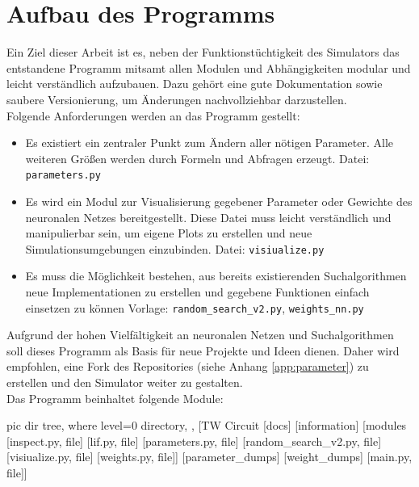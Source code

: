 \section{Aufbau des Programms}
\label{sec:imp_module}
	Ein Ziel dieser Arbeit ist es, neben der Funktionstüchtigkeit des Simulators das entstandene Programm mitsamt allen Modulen und Abhängigkeiten modular und leicht verständlich aufzubauen. Dazu gehört eine gute Dokumentation sowie saubere Versionierung, um Änderungen nachvollziehbar darzustellen.\\
	Folgende Anforderungen werden an das Programm gestellt:
	\begin{itemize}
		\item Es existiert ein zentraler Punkt zum Ändern aller nötigen Parameter. Alle weiteren Größen werden durch Formeln und Abfragen erzeugt.
		\subitem Datei: \texttt{parameters.py}
		\item Es wird ein Modul zur Visualisierung gegebener Parameter oder Gewichte des neuronalen Netzes bereitgestellt. Diese Datei muss leicht verständlich und manipulierbar sein, um eigene Plots zu erstellen und neue Simulationsumgebungen einzubinden.
		\subitem Datei: \texttt{visiualize.py}
		\item Es muss die Möglichkeit bestehen, aus bereits existierenden Suchalgorithmen neue Implementationen zu erstellen und gegebene Funktionen einfach einsetzen zu können
		\subitem Vorlage: \texttt{random\_search\_v2.py}, \texttt{weights\_nn.py}
	\end{itemize}
	Aufgrund der hohen Vielfältigkeit an neuronalen Netzen und Suchalgorithmen soll dieses Programm als Basis für neue Projekte und Ideen dienen. Daher wird empfohlen, eine Fork des Repositories (siehe Anhang \ref{app:parameter}) zu erstellen und den Simulator weiter zu gestalten.\\
	Das Programm beinhaltet folgende Module:\\
	\begin{minipage}{0.35\textwidth}
		\vspace{0.3cm}
		\begin{forest}
			pic dir tree,
			where level=0{}{%
				directory,
			},
			[TW Circuit
				[docs]
				[information]
				[modules
					[inspect.py, file]
					[lif.py, file]
					[parameters.py, file]
					[random\_search\_v2.py, file]
					[visiualize.py, file]
					[weights.py, file]]
				[parameter\_dumps]
				[weight\_dumps]
				[main.py, file]]
		\end{forest}
	\end{minipage}

